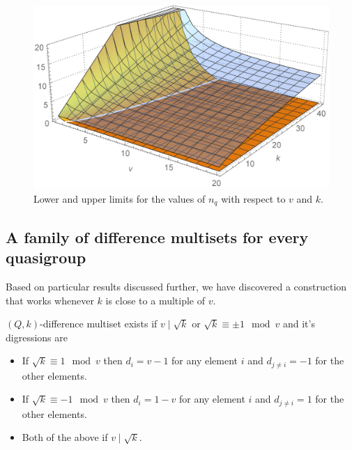     \begin{figure}
        \includegraphics[width=\textwidth]{assets/boundingSurfaces}
        \caption{Lower and upper limits for the values of $n_q$ with respect to $v$ and $k$.}
        \label{general:figure:limits}
    \end{figure}
    
\subsection{A family of difference multisets for every quasigroup}
    Based on particular results discussed further, we have discovered a construction that works whenever $k$ is close to a multiple of $v$.
    
    \begin{theorem}
        \label{regular:theorem:regular}
        $(Q,k)$-difference multiset exists if $v \mid \sqrt k$ or $\sqrt k \equiv \pm 1 \mod v$ and it's digressions are 
            \begin{itemize}
                \item If $\sqrt k \equiv 1 \mod v$ then $d_i = v-1$ for any element $i$ and $d_{j \neq i} = -1$ for the other elements.
                \item If $\sqrt k \equiv -1 \mod v$ then $d_i =1-v$ for any element $i$ and $d_{j \neq i} = 1$ for the other elements.
                \item Both of the above if $v \mid \sqrt k$.
            \end{itemize}
    \end{theorem}
    
